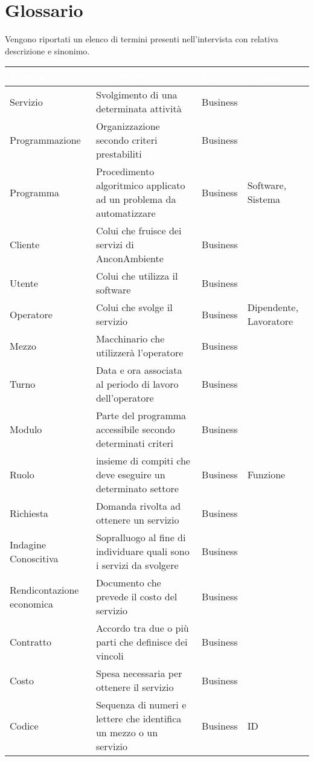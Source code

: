 \documentclass[green, fancy, 11pt]{elegantbook}
\begin{document}
\section{Glossario}
Vengono riportati un elenco di termini presenti nell'intervista con relativa descrizione e sinonimo.
{
	\begin{tabular}{|p{}|p{6cm}|l|p{4cm}|}
		\hline
		\rowcolor{DarkGreen}
		\textbf{\textcolor{white}{Termine}} & \textbf{\textcolor{white}{Descrizione}} & \textbf{\textcolor{white}{Tipo}} & \textbf{\textcolor{white}{Sinonimo}}\\
		\hline
		Servizio & Svolgimento di una determinata attività & Business & \\
		\hline
		Programmazione &Organizzazione secondo criteri prestabiliti &Business&\\
		\hline
		Programma & Procedimento algoritmico applicato ad un problema da automatizzare & Business & Software, Sistema\\
		\hline
		Cliente &Colui che fruisce dei servizi di AnconAmbiente &Business&\\
		\hline
		Utente & Colui che utilizza il software&Business&\\
		\hline
		Operatore & Colui che svolge il servizio& Business& Dipendente, Lavoratore\\
		\hline
		Mezzo & Macchinario che utilizzerà l'operatore&Business&\\
		\hline
		Turno & Data e ora associata al periodo di lavoro dell'operatore&Business&\\
		\hline
		Modulo&Parte del programma accessibile secondo determinati criteri&Business&\\
		\hline
		Ruolo &insieme di compiti che deve eseguire un determinato settore &Business& Funzione\\
		\hline
		Richiesta &Domanda rivolta ad ottenere un servizio& Business &\\
		\hline
		Indagine Conoscitiva &Sopralluogo al fine di individuare quali sono i servizi da svolgere &Business&\\ 
		\hline
		Rendicontazione economica& Documento che prevede il costo del servizio &Business&\\
		\hline
		Contratto &Accordo tra due o più parti che definisce dei vincoli &Business&\\
		\hline
		Costo & Spesa necessaria per ottenere il servizio &Business&\\
		\hline
		Codice & Sequenza di numeri e lettere che identifica un mezzo o un servizio &Business&ID\\ 

\end{tabular}}
\end{document}
